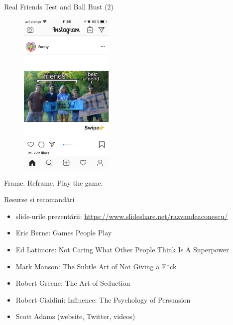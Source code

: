 \documentclass{simple}
\begin{document}
\begin{frame}{Real Friends Test and Ball Bust (2)}
  \begin{figure}
    \centering
    \includegraphics[width=0.4\textwidth]{img/die-homo.png}
  \end{figure}
\end{frame}

\begin{frame}{}
  \pause
  \centering
  \LARGE{Frame. Reframe. Play the game.}
\end{frame}

\begin{frame}{Resurse și recomandări}
  \begin{itemize}
    \item slide-urile prezentării: \url{https://www.slideshare.net/razvandeaconescu/}
    \item Eric Berne: Games People Play
    \item Ed Latimore: Not Caring What Other People Think Is A Superpower
    \item Mark Manson: The Subtle Art of Not Giving a F*ck
    \item Robert Greene: The Art of Seduction
    \item Robert Cialdini: Influence: The Psychology of Persuasion
    \item Scott Adams (website, Twitter, videos)
  \end{itemize}
\end{frame}
\end{document}

